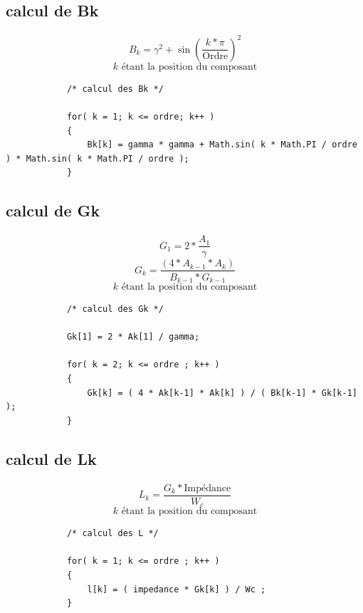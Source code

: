 \documentclass[a4paper,11pt]{article}
\begin{document}
    \clearpage

    \subsection{calcul de Bk }
        \paragraph{}
        \[ B_{k} = \gamma ^2 + \sin( \frac{k * \pi}{\mbox{Ordre}} ) ^2 \]
        \[ k \mbox{ étant la position du composant} \]
        \begin{lstlisting}
            /* calcul des Bk */

            for( k = 1; k <= ordre; k++ )
            {
                Bk[k] = gamma * gamma + Math.sin( k * Math.PI / ordre ) * Math.sin( k * Math.PI / ordre );
            }

        \end{lstlisting}

    \subsection{calcul de Gk }
        \paragraph{}
        \[ G_1 = 2 * \frac{A_1}{\gamma} \]
        \[ G_{k} = \frac{(4 * A_{k-1} * A_{k})}{B_{k-1} * G_{k-1}} \]
        \[ k \mbox{ étant la position du composant} \]
        \begin{lstlisting}
            /* calcul des Gk */

            Gk[1] = 2 * Ak[1] / gamma;

            for( k = 2; k <= ordre ; k++ )
            {
                Gk[k] = ( 4 * Ak[k-1] * Ak[k] ) / ( Bk[k-1] * Gk[k-1] );
            }

        \end{lstlisting}

    \clearpage

    \subsection{calcul de Lk }
        \paragraph{}
        \[ L_{k} = \frac{G_{k} * \mbox{Impédance}}{W_{c}} \]
        \[ k \mbox{ étant la position du composant} \]
        \begin{lstlisting}
            /* calcul des L */

            for( k = 1; k <= ordre ; k++ )
            {
                l[k] = ( impedance * Gk[k] ) / Wc ;
            }

        \end{lstlisting}
\end{document}
